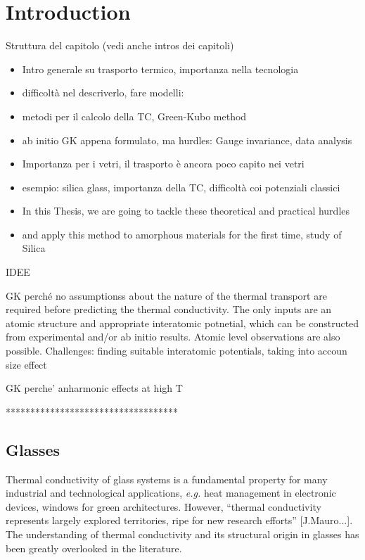 \chapter{Introduction}

Struttura del capitolo  (vedi anche intros dei capitoli)
\begin{itemize}
    \item Intro generale su trasporto termico, importanza nella tecnologia
    \item difficoltà nel descriverlo, fare modelli: 
    \item metodi per il calcolo della TC, Green-Kubo method
    \item ab initio GK appena formulato, ma hurdles: Gauge invariance, data analysis
    \item Importanza per i vetri, il trasporto è ancora poco capito nei vetri
    \item esempio: silica glass, importanza della TC, difficoltà coi potenziali classici
    \item In this Thesis, we are going to tackle these theoretical and practical hurdles
    \item and apply this method to amorphous materials for the first time, study of Silica
\end{itemize}


IDEE

GK perché no assumptionss about the nature of the thermal transport are required before predicting the thermal conductivity. The only inputs are an atomic structure and appropriate interatomic potnetial, which can be constructed from experimental and/or ab initio results. Atomic level observations are also possible. 
Challenges: finding suitable interatomic potentials, taking into accoun size effect

GK perche' anharmonic effects at high T


***********************************

\section{Glasses}
Thermal conductivity of glass systems is a fundamental property for many industrial and technological applications, \emph{e.g.} heat management in electronic devices, windows for green architectures.
However, ``thermal conductivity represents largely explored territories, ripe for new research efforts'' [J.Mauro...]\cite{MauroFM14,Mauro2014}. The understanding of thermal conductivity and its structural origin in glasses has been greatly overlooked in the literature. 


